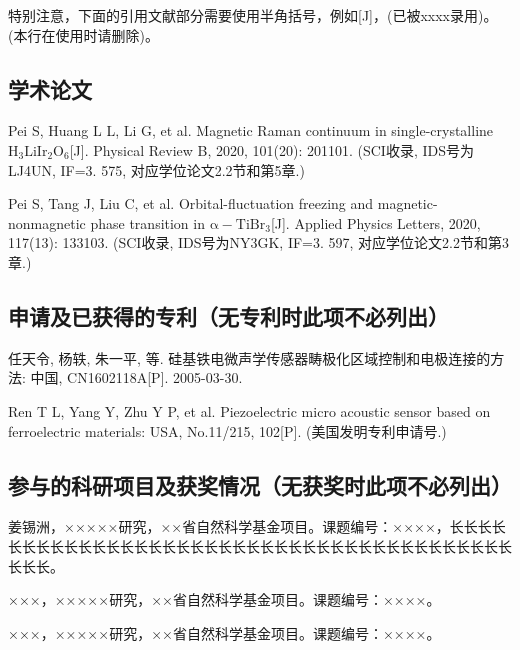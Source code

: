 \begin{resume}
  特别注意，下面的引用文献部分需要使用半角括号，例如[J]，(已被xxxx录用)。(本行在使用时请删除)。

  \subsection*{学术论文}

  \begin{achievements}
    \item Pei S, Huang L L, Li G, et al. Magnetic Raman continuum in single-crystalline $\mathrm{H_3LiIr_2O_6}$[J]. Physical Review B, 2020, 101(20): 201101. (SCI收录, IDS号为LJ4UN, IF=3. 575, 对应学位论文2.2节和第5章.)
    \item Pei S, Tang J, Liu C, et al. Orbital-fluctuation freezing and magnetic-nonmagnetic phase transition in $\mathrm{α-TiBr_3}$[J]. Applied Physics Letters, 2020, 117(13): 133103. (SCI收录, IDS号为NY3GK, IF=3. 597, 对应学位论文2.2节和第3章.)
  \end{achievements}

  \subsection*{申请及已获得的专利（无专利时此项不必列出）}

  \begin{achievements}
    \item 任天令, 杨轶, 朱一平, 等. 硅基铁电微声学传感器畴极化区域控制和电极连接的方法: 中国, CN1602118A[P]. 2005-03-30.
    \item Ren T L, Yang Y, Zhu Y P, et al. Piezoelectric micro acoustic sensor based on ferroelectric materials: USA, No.11/215, 102[P]. (美国发明专利申请号.)
  \end{achievements}

  \subsection*{参与的科研项目及获奖情况（无获奖时此项不必列出）}
  \begin{achievements}
    \item 姜锡洲，×××××研究，××省自然科学基金项目。课题编号：××××，长长长长长长长长长长长长长长长长长长长长长长长长长长长长长长长长长长长长长长长长长长长。
    \item ×××，×××××研究，××省自然科学基金项目。课题编号：××××。
    \item ×××，×××××研究，××省自然科学基金项目。课题编号：××××。
  \end{achievements}

\end{resume}
